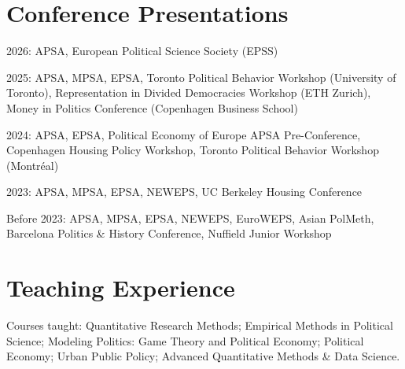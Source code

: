 \documentclass[letterpaper, 10pt]{article}
\newif\ifjobmarket
\renewenvironment{itemize}{
  \begin{list}{}{
    \setlength{\leftmargin}{0em}
  }
}{
  \end{list}
}
\newcommand{\CVTeaching}{%
\vspace*{-0.1cm}
\section*{Teaching Experience}
\ifjobmarket
\textit{University of California, Davis}
\begin{itemize}
  \item Quantitative Research Methods (graduate), Fall 2023, Fall 2024, Fall 2025
  \item Empirical Methods in Political Science (graduate), Winter 2024
  \item Modeling Politics: Game Theory and Political Economy (graduate), Winter 2025
  \item Political Economy (undergraduate), Winter 2024, Fall 2024, Winter 2026
  \item Urban Public Policy (undergraduate), Winter 2025
  \item Advanced Quantitative Methods \& Data Science (undergraduate), Fall 2025
\end{itemize}

\begin{minipage}{\linewidth}
\textit{Invited teaching}
\begin{itemize}
  \item Guest lecturer, \textit{Writing a Great Article} (PhD course), Aarhus University, September 17, 2026 (virtual)
\end{itemize}
\end{minipage}
\else
Courses taught: Quantitative Research Methods; Empirical Methods in Political Science; Modeling Politics: Game Theory and Political Economy; Political Economy; Urban Public Policy; Advanced Quantitative Methods \& Data Science.
\fi

\ifjobmarket
\vspace*{-0.1cm}
\section*{Graduate and Undergraduate Advising}
\begin{itemize}
  \item Dissertation committee member, completed: Alex Cohen (Ph.D., 2026; Postdoctoral Scholar, Democracy Policy Lab, Goldman School of Public Policy, UC Berkeley)
  \item Dissertation committee member, ongoing: Haley Daarstad, Julian Haddad, Daniel Scates, and Zeynep Koseoglu Onat
  \item Undergraduate research advising: Brady Horton (honors thesis, 2025); Jenny Zhao (honors thesis proposal, 2026)
\end{itemize}
\fi

}
\begin{document}
\vspace*{-0.1cm}
\section*{Conference Presentations}

\begin{itemize}
  \item 2026: APSA, European Political Science Society (EPSS)
  \item 2025: APSA, MPSA, EPSA, Toronto Political Behavior Workshop (University of Toronto), Representation in Divided Democracies Workshop (ETH Zurich), Money in Politics Conference (Copenhagen Business School)
  \item 2024: APSA, EPSA, Political Economy of Europe APSA Pre-Conference, Copenhagen Housing Policy Workshop, Toronto Political Behavior Workshop (Montréal)
  \item 2023: APSA, MPSA, EPSA, NEWEPS, UC Berkeley Housing Conference
  \item Before 2023: APSA, MPSA, EPSA, NEWEPS, EuroWEPS, Asian PolMeth, Barcelona Politics \& History Conference, Nuffield Junior Workshop
\end{itemize}

\CVTeaching

\vspace*{-0.1cm}
\CVsoftware

\ifjobmarket
\vspace*{-0.1cm}
\section*{University and Departmental Service}
\begin{itemize}
  \item Invited Speaker Series Committee, UC Davis: member, 2023--2024; chair, 2024--Present
  \item Member, Comparative Politics Faculty Search Committee, UC Davis, 2025--2026
  \item Member, TA Allocation Model Working Group, UC Davis, 2025--2026
  \item Member, Political Methodology Subfield Committee, UC Davis, 2023--Present
  \item Graduate professionalization workshops, UC Davis: publication strategy (2024); academic feedback and journal reviewing (2025); academic publishing (2026)
\end{itemize}
\fi

\ifjobmarket
\vspace*{-0.1cm}
\end{document}
